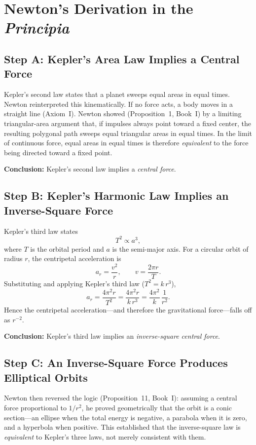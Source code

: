 \documentclass[12pt]{article}
\begin{document}
\section{Newton's Derivation in the \textit{Principia}}

\subsection{Step A: Kepler's Area Law Implies a Central Force}

Kepler's second law states that a planet sweeps equal areas in equal times.
Newton reinterpreted this kinematically.
If no force acts, a body moves in a straight line (Axiom~I).
Newton showed (Proposition~1, Book~I) by a limiting triangular-area argument
that, if impulses always point toward a fixed center, the resulting polygonal
path sweeps equal triangular areas in equal times.
In the limit of continuous force, equal areas in equal times is therefore
\emph{equivalent} to the force being directed toward a fixed point.

\textbf{Conclusion:} Kepler's second law implies a \emph{central force}.

\subsection{Step B: Kepler's Harmonic Law Implies an Inverse-Square Force}

Kepler's third law states
\[
  T^{2} \propto a^{3},
\]
where $T$ is the orbital period and $a$ is the semi-major axis.
For a circular orbit of radius $r$, the centripetal acceleration is
\[
  a_{r} = \frac{v^{2}}{r}, \qquad v = \frac{2\pi r}{T}.
\]
Substituting and applying Kepler's third law ($T^{2} = k\,r^{3}$),
\[
  a_{r} = \frac{4\pi^{2} r}{T^{2}} = \frac{4\pi^{2} r}{k\,r^{3}}
         = \frac{4\pi^{2}}{k}\,\frac{1}{r^{2}}.
\]
Hence the centripetal acceleration---and therefore the gravitational
force---falls off as $r^{-2}$.

\textbf{Conclusion:} Kepler's third law implies an \emph{inverse-square
central force}.

\subsection{Step C: An Inverse-Square Force Produces Elliptical Orbits}

Newton then reversed the logic (Proposition~11, Book~I): assuming a central
force proportional to $1/r^{2}$, he proved geometrically that the orbit is a
conic section---an ellipse when the total energy is negative, a parabola when
it is zero, and a hyperbola when positive.
This established that the inverse-square law is \emph{equivalent} to Kepler's
three laws, not merely consistent with them.
\end{document}
